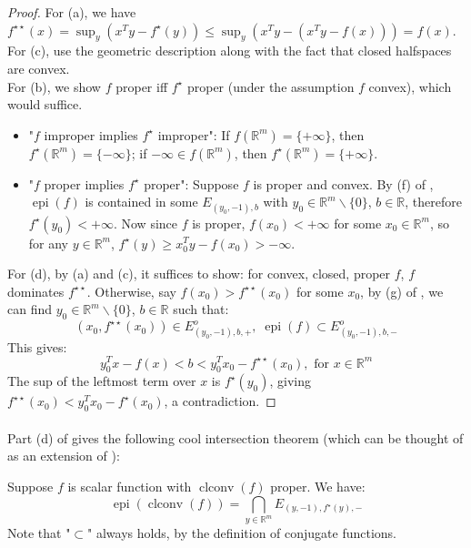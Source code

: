 \begin{proof}
	For (a), we have $f^{\star\star}(x)=\sup_y\left(x^Ty-f^\star(y)\right)\leq \sup_y \left(x^Ty-\left(x^Ty-f(x)\right)\right)=f(x)$.\\
	For (c), use the geometric description along with the fact that closed halfspaces are convex.\\
	For (b), we show $f$ proper iff $f^\star$ proper (under the assumption $f$ convex), which would suffice.
	\begin{itemize}
		\item "$f$ improper implies $f^\star$ improper": If $f(\mathbb{R}^m)=\{+\infty\}$, then $f^\star(\mathbb{R}^m)=\{-\infty\}$; if $-\infty\in f(\mathbb{R}^m)$, then $f^\star(\mathbb{R}^m)=\{+\infty\}$.
		\item "$f$ proper implies $f^\star$ proper": Suppose $f$ is proper and convex. By (f) of , $\operatorname{epi}(f)$ is contained in some $E_{(y_0,-1),b}$ with $y_0\in \mathbb{R}^{m}\smallsetminus \{0\}$, $b\in \mathbb{R}$, therefore $f^\star(y_0)<+\infty$. Now since $f$ is proper, $f(x_0)<+\infty$ for some $x_0\in \mathbb{R}^m$, so for any $y\in \mathbb{R}^m$, $f^\star(y)\geq x_0^Ty-f(x_0)>-\infty$.
	\end{itemize}
	For (d), by (a) and (c), it suffices to show: for convex, closed, proper $f$, $f$ dominates $f^{\star\star}$. Otherwise, say $f(x_0)>f^{\star\star}(x_0)$ for some $x_0$, by (g) of , we can find $y_0\in \mathbb{R}^m\smallsetminus\{0\}$, $b\in \mathbb{R}$ such that:
	\[
		\left(x_0,f^{\star\star}(x_0)\right)\in E^{o}_{(y_0,-1),b,+}, \; \operatorname{epi}(f)\subset E^o_{(y_0,-1),b,-}
	\]
	This gives:
	\[
		y_0^Tx-f(x)<b<y_0^Tx_0-f^{\star\star}(x_0),\text{ for }x\in \mathbb{R}^m
	\]
	The sup of the leftmost term over $x$ is $f^\star(y_0)$, giving $f^{\star\star}(x_0)<y_0^Tx_0-f^\star(x_0)$, a contradiction.
\end{proof}

\paragraph{}Part (d) of  gives the following cool intersection theorem (which can be thought of as an extension of ):

\begin{coro}\label{coro:025-epigraph-conjugacy-intersection}
	Suppose $f$ is scalar function with $\operatorname{clconv}(f)$ proper. We have:
	\[
		\operatorname{epi}(\operatorname{clconv}(f)) = \bigcap_{y\in \mathbb{R}^m}E_{(y,-1),f^\star(y), -}
	\]
	Note that "$\subset$" always holds, by the definition of conjugate functions.
\end{coro}

